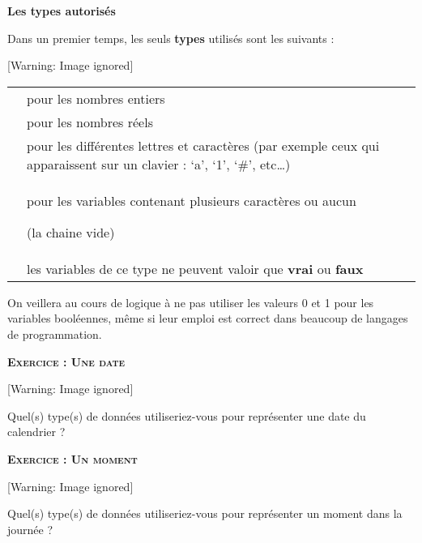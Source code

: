 {\sffamily\bfseries\upshape
Les types autorisés}

{
Dans un premier temps, les seuls \textbf{types} utilisés sont les
suivants :}

\begin{center}
 [Warning: Image ignored] %

\end{center}
\begin{center}
\tablehead{}
\begin{supertabular}{m{1.8109999cm}|m{11.918cm}}
\raggedleft  {} &
 pour les nombres entiers\\
\raggedleft  {} &
 pour les nombres réels\\
\raggedleft  {} &
 pour les différentes lettres et caractères (par
exemple ceux qui apparaissent sur un clavier : ‘a’, ‘1’, ‘\#’, etc…)\\
\raggedleft  {} &
{ pour les variables contenant plusieurs
caractères ou aucun}

 (la chaine vide)\\
\raggedleft  {} &
 les variables de ce type ne peuvent valoir que
\textbf{vrai} ou \textbf{faux}\\
\end{supertabular}
\end{center}
{
On veillera au cours de logique à ne pas utiliser les valeurs 0 et 1
pour les variables booléennes, même si leur emploi est correct dans
beaucoup de langages de programmation.}

{\sffamily\bfseries\scshape
Exercice : Une date}

\begin{center}
 [Warning: Image ignored] %

\end{center}
{
Quel(s) type(s) de données utiliseriez-vous pour représenter une date du
calendrier ? }

{\sffamily\bfseries\scshape
Exercice : Un moment}

\begin{center}
 [Warning: Image ignored] %

\end{center}
{
Quel(s) type(s) de données utiliseriez-vous pour représenter un moment
dans la journée ? }

